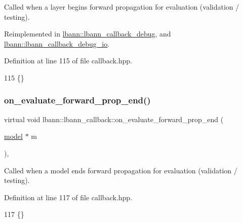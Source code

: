 Called when a layer begins forward propagation for evaluation (validation / testing). 

Reimplemented in \hyperlink{classlbann_1_1lbann__callback__debug_a83fe16882119a54afe59ba616fe1722a}{lbann\+::lbann\+\_\+callback\+\_\+debug}, and \hyperlink{classlbann_1_1lbann__callback__debug__io_ac9b36fc36ab6faa9de44db026addf02a}{lbann\+::lbann\+\_\+callback\+\_\+debug\+\_\+io}.



Definition at line 115 of file callback.\+hpp.


\begin{DoxyCode}
115 \{\}
\end{DoxyCode}
\mbox{\label{classlbann_1_1lbann__callback_a0794f3fb88db6fef53f0e2f235f94424}} 
\subsubsection{\texorpdfstring{on\+\_\+evaluate\+\_\+forward\+\_\+prop\+\_\+end()}{on\_evaluate\_forward\_prop\_end()}\hspace{0.1cm}{\footnotesize\ttfamily [1/2]}}
{\footnotesize\ttfamily virtual void lbann\+::lbann\+\_\+callback\+::on\+\_\+evaluate\+\_\+forward\+\_\+prop\+\_\+end (\begin{DoxyParamCaption}\item[{\hyperlink{classlbann_1_1model}{model} $\ast$}]{m }\end{DoxyParamCaption})\hspace{0.3cm}{\ttfamily [inline]}, {\ttfamily [virtual]}}

Called when a model ends forward propagation for evaluation (validation / testing). 

Definition at line 117 of file callback.\+hpp.


\begin{DoxyCode}
117 \{\}
\end{DoxyCode}
\mbox{\label{classlbann_1_1lbann__callback_ae23c5a61b81dbdfbd79736ac2b6035aa}} 
